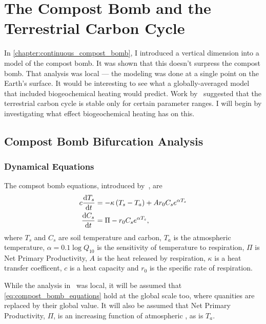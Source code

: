 \chapter{The Compost Bomb and the Terrestrial Carbon Cycle}
\label{chapter:global_bomb}
\graphicspath{{global_bomb/figs/}}


In \cref{chapter:continuous_compost_bomb}, I introduced a vertical dimension into a model of the compost bomb. It was shown that this doesn't
surpress the compost bomb. That analysis was local ---  the modeling was done at a single point on the Earth's surface. It would be interesting to see
what a globally-averaged model that included biogeochemical heating would predict. Work by~\cite{Cox2006} suggested that the terrestrial carbon cycle is stable
only for certain parameter ranges. I will begin by investigating what effect biogeochemical heating has on this.

\section{Compost Bomb Bifurcation Analysis}

\subsection{Dynamical Equations}
The compsot bomb equations, introduced by~\cite{Luke2011}, are
\begin{subequations}
  \label{eq:compost_bomb_equations}
  \begin{align}
    c \dv{T_s}{t} &= - \kappa \left(T_s - T_a\right) + Ar_0C_se^{\alpha T_s} \label{eq:compost_bomb_soil_temperature} \\
    \dv{C_s}{t} &= \Pi - r_0C_se^{\alpha T_s}, \label{eq:compost_bomb_soil_carbon}
  \end{align}
\end{subequations}
where $T_s$ and $C_s$ are soil temperature and carbon, $T_a$ is the atmospheric temperature, $\alpha = 0.1\log Q_{10}$ is the sensitivity of
temperature to respiration, $\Pi$ is Net Primary Productivity, $A$ is the heat released by respiration, $\kappa$ is a heat transfer coefficent,
$c$ is a heat capacity and $r_0$ is the specific rate of respiration.

While the analysis in~\cite{Luke2011} was local, it will be assumed that \cref{eq:compost_bomb_equations} hold at the global scale too, where quanities are
replaced by their global value. It will also be assumed that Net Primary Productivity, $\Pi$, is an increasing function of atmospheric , as is $T_a$. 

